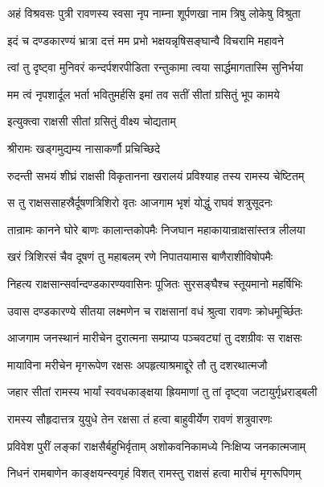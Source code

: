 
\twolineshloka
{अहं विश्रवसः पुत्री रावणस्य स्वसा नृप}
{नाम्ना शूर्पणखा नाम त्रिषु लोकेषु विश्रुता}%

\twolineshloka
{इदं च दण्डकारण्यं भ्रात्रा दत्तं मम प्रभो}
{भक्षयन्नृषिसङ्घान्वै विचरामि महावने}%

\twolineshloka
{त्वां तु दृष्ट्वा मुनिवरं कन्दर्पशरपीडिता}
{रन्तुकामा त्वया सार्द्धमागतास्मि सुनिर्भया}%

\twolineshloka
{मम त्वं नृपशार्दूल भर्ता भवितुमर्हसि}
{इमां तव सतीं सीतां ग्रसितुं भूप कामये}%



\onelineshloka
{इत्युक्त्वा राक्षसी सीतां ग्रसितुं वीक्ष्य चोद्यताम्}%

\onelineshloka
{श्रीरामः खड्गमुद्यम्य नासाकर्णौ प्रचिच्छिदे}%

\twolineshloka
{रुदन्ती सभयं शीघ्रं राक्षसी विकृतानना}
{खरालयं प्रविश्याह तस्य रामस्य चेष्टितम्}%

\twolineshloka
{स तु राक्षससाहस्रैर्दूषणत्रिशिरो वृतः}
{आजगाम भृशं योद्धुं राघवं शत्रुसूदनः}%

\twolineshloka
{तान्रामः कानने घोरे बाणः कालान्तकोपमैः}
{निजघान महाकायान्राक्षसांस्तत्र लीलया}%

\twolineshloka
{खरं त्रिशिरसं चैव दूषणं तु महाबलम्}
{रणे निपातयामास बाणैराशीविषोपमैः}%

\twolineshloka
{निहत्य राक्षसान्सर्वान्दण्डकारण्यवासिनः}
{पूजितः सुरसङ्घैश्च स्तूयमानो महर्षिभिः}%

\twolineshloka
{उवास दण्डकारण्ये सीतया लक्ष्मणेन च}
{राक्षसानां वधं श्रुत्वा रावणः क्रोधमूर्च्छितः}%

\twolineshloka
{आजगाम जनस्थानं मारीचेन दुरात्मना}
{सम्प्राप्य पञ्चवट्यां तु दशग्रीवः स राक्षसः}%

\twolineshloka
{मायाविना मरीचेन मृगरूपेण रक्षसः}
{अपहृत्याश्रमाद्दूरे तौ तु दशरथात्मजौ}%

\twolineshloka
{जहार सीतां रामस्य भार्यां स्ववधकाङ्क्षया}
{ह्रियमाणां तु तां दृष्ट्वा जटायुर्गृध्रराड्बली}%

\twolineshloka
{रामस्य सौहृदात्तत्र युयुधे तेन रक्षसा}
{तं हत्वा बाहुवीर्येण रावणं शत्रुवारणः}%

\twolineshloka
{प्रविवेश पुरीं लङ्कां राक्षसैर्बहुभिर्वृताम्}
{अशोकवनिकामध्ये निःक्षिप्य जनकात्मजाम्}%

\twolineshloka
{निधनं रामबाणेन काङ्क्षयन्स्वगृहं विशत्}
{रामस्तु राक्षसं हत्वा मारीचं मृगरूपिणम्}%

